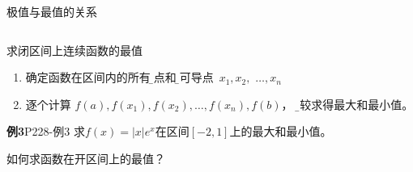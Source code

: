 \begin{frame}{极值与最值的关系}
\begin{columns}
\begin{center}
							\end{center}
			\begin{center}
			\end{center}
	\end{columns}
\end{frame}

\begin{frame}{求闭区间上连续函数的最值}
	\linespread{1.2}\pause 
	{}\pause 
	\begin{enumerate}
	  \item 确定函数在区间内的所有{\b 驻点}和{\b 不可导点} \,$x_1,x_2,$ $\ldots,x_n$\pause 
	  \item 逐个计算
	  $f(a),f(x_1),f(x_2),\ldots,f(x_n),f(b)$，
	  {\b 比较求得最大和最小值}。\pause 
	\end{enumerate}
	\begin{exampleblock}{{\bf 例3}\hfill P228-例3}
		求$f(x)=|x|e^x$在区间$[-2,1]$上的最大和最小值。
	\end{exampleblock}\pause 
	{}如何求函数在开区间上的最值？
\end{frame}

